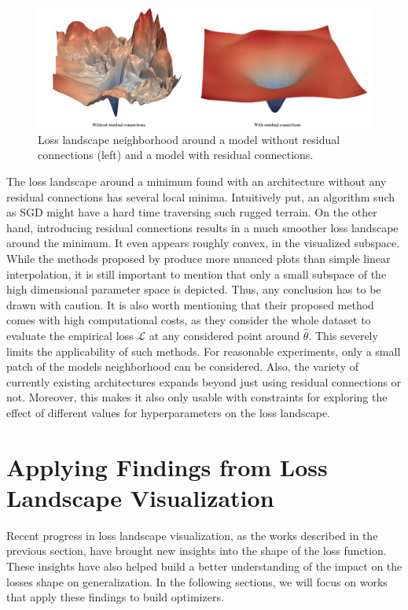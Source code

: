 \documentclass[a4paper]{scrartcl}
\begin{document}
\begin{figure}[H]
	\centering
	\includegraphics[width=\linewidth]{figures/2dloss.pdf}
	\caption{Loss landscape neighborhood around a model without residual connections (left) and a model with residual connections.}
	\label{fig:2dloss}
\end{figure}
The loss landscape around a minimum found with an architecture without any residual connections has several local minima. Intuitively put, an algorithm such as SGD might have a hard time traversing such rugged terrain. On the other hand, introducing residual connections results in a much smoother loss landscape around the minimum. It even appears roughly convex, in the visualized subspace.\\
While the methods proposed by \cite{li2017visualizing} produce more nuanced plots than simple linear interpolation, it is still important to mention that only a small subspace of the high dimensional parameter space is depicted. Thus, any conclusion has to be drawn with caution. It is also worth mentioning that their proposed method comes with high computational costs, as they consider the whole dataset to evaluate the empirical loss $\mathcal{L}$ at any considered point around $\hat{\theta}$. This severely limits the applicability of such methods. For reasonable experiments, only a small patch of the models neighborhood can be considered. Also, the variety of currently existing architectures expands beyond just using residual connections or not. Moreover, this makes it also only usable with constraints for exploring the effect of different values for hyperparameters on the loss landscape.









\section*{Applying Findings from Loss Landscape Visualization}
Recent progress in loss landscape visualization, as the works described in the previous section, have brought new insights into the shape of the loss function. These insights have also helped build a better understanding of the impact on the losses shape on generalization. In the following sections, we will focus on works that apply these findings to build optimizers.
\end{document}
